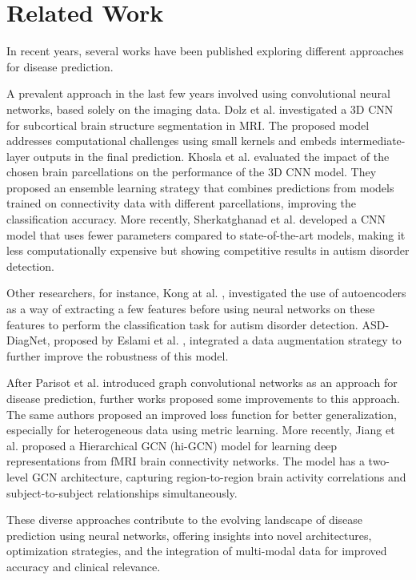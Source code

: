 \section{Related Work}

\quad In recent years, several works have been published exploring different approaches for disease prediction.

A prevalent approach in the last few years involved using convolutional neural networks, based solely on the imaging data. Dolz et al. \cite{Dolz2018} investigated a 3D CNN for subcortical brain structure segmentation in MRI. The proposed model addresses computational challenges using small kernels and embeds intermediate-layer outputs in the final prediction. Khosla et al. \cite{Khosla2019} evaluated the impact of the chosen brain parcellations on the performance of the 3D CNN model. They proposed an ensemble learning strategy that combines predictions from models trained on connectivity data with different parcellations, improving the classification accuracy. More recently, Sherkatghanad et al. \cite{Sherkatghanad2020} developed a CNN model that uses fewer parameters compared to state-of-the-art models, making it less computationally expensive but showing competitive results in autism disorder detection.

Other researchers, for instance, Kong at al. \cite{Kong2019}, investigated the use of autoencoders as a way of extracting a few features before using neural networks on these features to perform the classification task for autism disorder detection. ASD-DiagNet, proposed by Eslami et al. \cite{Eslami2019}, integrated a data augmentation strategy to further improve the robustness of this model.

After Parisot et al. \cite{Parisot17} introduced graph convolutional networks as an approach for disease prediction, further works proposed some improvements to this approach. The same authors proposed an improved loss function for better generalization, especially for heterogeneous data using metric learning. More recently, Jiang et al. \cite{Jiang2020} proposed a Hierarchical GCN (hi-GCN) model for learning deep representations from fMRI brain connectivity networks. The model has a two-level GCN architecture, capturing region-to-region brain activity correlations and subject-to-subject relationships simultaneously.

These diverse approaches contribute to the evolving landscape of disease prediction using neural networks, offering insights into novel architectures, optimization strategies, and the integration of multi-modal data for improved accuracy and clinical relevance.